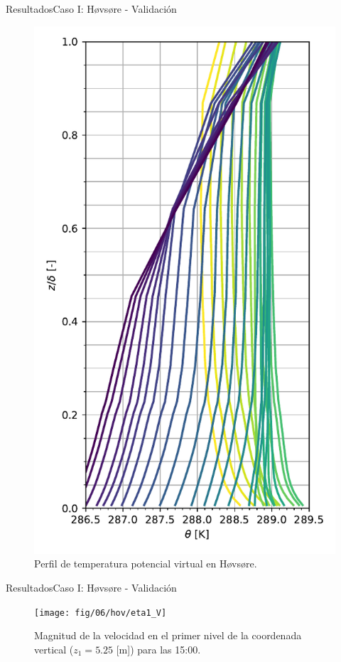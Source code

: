 \documentclass[mathserif,10pt]{beamer}
\begin{document}
\begin{frame}{Resultados}{Caso I: Høvsøre - Validación}
\begin{figure}[H]
\begin{minipage}{0.5\linewidth}
		\end{minipage}%
		\begin{minipage}{0.5\linewidth}
			\centering
			\includegraphics[width=0.75\linewidth,trim={0cm 5mm 0cm 0cm},clip]{fig/06/hov/temp_profile}%
		\end{minipage}%
		
		\caption{Perfil de temperatura potencial virtual en Høvsøre.}
		\label{fig:06_hov_pbl}
	\end{figure}
\end{frame}

\begin{frame}{Resultados}{Caso I: Høvsøre - Validación}
	\begin{figure}[H]
		\centering
		\texttt{[image: fig/06/hov/eta1\_V]}%
		\caption{Magnitud de la velocidad en el primer nivel de la coordenada vertical ($z_1=5.25$ [m]) para las 15:00.}
		\label{fig:06_hov_eta1}
	\end{figure}
\end{frame}
\end{document}
